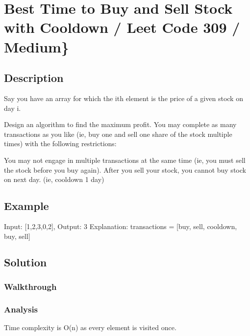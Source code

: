 \documentclass[]{book}
\begin{document}
\hypertarget{best-time-to-buy-and-sell-stock-with-cooldown-leet-code-309-medium}{%
\section{Best Time to Buy and Sell Stock with Cooldown / Leet Code 309 / Medium\}}\label{best-time-to-buy-and-sell-stock-with-cooldown-leet-code-309-medium}}

\hypertarget{description-35}{%
\subsection{Description}\label{description-35}}

Say you have an array for which the ith element is the price of a given stock on day i.

Design an algorithm to find the maximum profit. You may complete as many transactions as you like (ie, buy one and
sell one share of the stock multiple times) with the following restrictions:

You may not engage in multiple transactions at the same time (ie, you must sell the stock before you buy again).
After you sell your stock, you cannot buy stock on next day. (ie, cooldown 1 day)

\hypertarget{example-34}{%
\subsection{Example}\label{example-34}}

Input: {[}1,2,3,0,2{]}, Output: 3
Explanation: transactions = {[}buy, sell, cooldown, buy, sell{]}

\hypertarget{solution-28}{%
\subsection{Solution}\label{solution-28}}

\hypertarget{walkthrough-34}{%
\subsubsection{Walkthrough}\label{walkthrough-34}}

\hypertarget{analysis-37}{%
\subsubsection{Analysis}\label{analysis-37}}

Time complexity is O(n) as every element is visited once.
\end{document}

